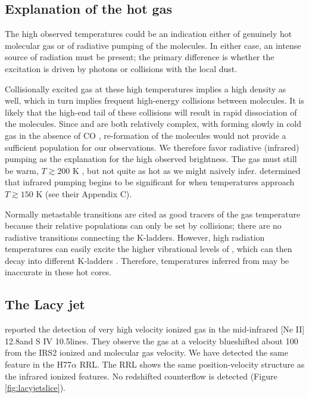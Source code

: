 \subsection{Explanation of the hot gas}
The high observed temperatures could be an indication either of genuinely hot
molecular gas or of radiative pumping of the \formaldehyde molecules.  In
either case, an intense source of radiation must be present; the primary
difference is whether the excitation is driven by photons or collisions with
the local dust.

Collisionally excited gas at these high temperatures implies a high density as
well, which in turn implies frequent high-energy collisions between molecules.
It is likely that the high-end tail of these collisions will result in rapid
dissociation of the molecules.  Since \formaldehyde and \ammonia are both
relatively complex, with \ammonia forming slowly in cold gas in the absence of
CO \citep{Caselli?}, re-formation of the molecules would not provide a
sufficient population for our observations.  We therefore favor radiative
(infrared) pumping as the explanation for the high observed brightness.  The gas
must still be warm, $T\gtrsim200$ K \citep{Henkel2013a}, but not quite as hot
as we might naively infer.  \citet{Mangum1993a} determined that infrared
pumping begins to be significant for \formaldehyde when temperatures approach
$T\gtrsim150$ K (see their Appendix C).

Normally \ammonia metastable transitions are cited as good tracers of the gas
temperature because their relative populations can only be set by collisions;
there are no radiative transitions connecting the K-ladders.  However, high
radiation temperatures can easily excite the higher vibrational levels of
\ammonia, which can then decay into different K-ladders \citep[][gives an
overview of the selection pseudo-rules]{Henkel2013a}.  Therefore, temperatures
inferred from \ammonia may be inaccurate in these hot cores.

\subsection{The Lacy jet}
\citet{Lacy2007a} reported the detection of very high velocity ionized gas
in the mid-infrared [Ne II] 12.8\um and S IV 10.5\um lines.  They observe the
gas at a velocity blueshifted about 100 \kms from the IRS2 ionized and molecular
gas velocity.  We have detected the same feature in the H77$\alpha$ RRL.
The RRL shows the same position-velocity structure as the infrared ionized
features.  No redshifted counterflow is detected (Figure \ref{fig:lacyjetslice}).

